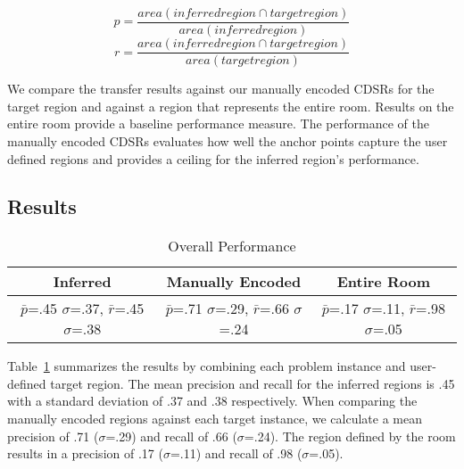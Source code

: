 \begin{equation}
	p=\frac{area(inferred region \cap target region)}{area(inferred region)}
\end{equation}
\begin{equation}
	r=\frac{area(inferred region \cap target region)}{area(target region)}
\end{equation}


We compare the transfer results against our manually encoded CDSRs for the target region and against a region that represents the entire room. Results on the entire room provide a baseline performance measure. The performance of the manually encoded CDSRs evaluates how well the anchor points capture the user defined regions and provides a ceiling for the inferred region's performance.

\subsection{Results}
\begin{table}
\small
\caption{Overall Performance}
  \label{tab:overall}	
\begin{tabular}{|c|c|c|}
\hline
Inferred & Manually Encoded & Entire Room \\
\hline
$\bar{p}$=.45 $\sigma$=.37, $\bar{r}$=.45 $\sigma$=.38 & $\bar{p}$=.71 $\sigma$=.29, $\bar{r}$=.66 $\sigma$=.24  & $\bar{p}$=.17 $\sigma$=.11, $\bar{r}$=.98 $\sigma$=.05  \\
\hline
\end{tabular}
\end{table}


Table~\ref{tab:overall} summarizes the results by combining each problem instance and user-defined target region. The mean precision and recall for the inferred regions is .45 with a standard deviation of .37 and .38 respectively. When comparing the manually encoded regions against each target instance, we calculate a mean precision of .71 ($\sigma$=.29) and recall of .66 ($\sigma$=.24). The region defined by the room results in a precision of .17 ($\sigma$=.11) and recall of .98 ($\sigma$=.05).

